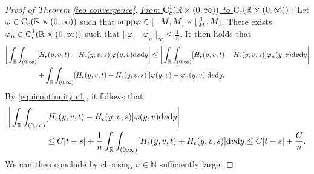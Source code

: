 \documentclass[11pt]{article}
\numberwithin{equation}{section}
\newcommand{\supp}{\textup{supp}}
\newcommand{\der}{\textup{d}}
\begin{document}
\begin{proof}[Proof of Theorem \ref{teo convergence}]
\textit{\underline{From $\textup{C}^{1}_{c}(\mathbb{R}\times(0,\infty))$ to  $\textup{C}_{c}(\mathbb{R}\times(0,\infty)):$}}  Let $\varphi\in\textup{C}_{c}(\mathbb{R}\times(0,\infty))$ such that $\supp\varphi\in[-M,M]\times [\frac{1}{M},M]$. There exists $\varphi_{n}\in\textup{C}^{1}_{c}(\mathbb{R}\times(0,\infty))$ such that $||\varphi-\varphi_{n}||_{\infty}\leq \frac{1}{n}$. It then holds that
\begin{align*}
    \bigg|\int_{\mathbb{R}}\int_{(0,\infty)} & [H_{\epsilon}(y,v,t)-H_{\epsilon}(y,v,s)]\varphi(y,v)\der v \der y\bigg|\leq \bigg|\int_{\mathbb{R}}\int_{(0,\infty)} [H_{\epsilon}(y,v,t)-H_{\epsilon}(y,v,s)]\varphi_{n}(y,v)\der v \der y\bigg|\\
    &+\int_{\mathbb{R}}\int_{(0,\infty)} [H_{\epsilon}(y,v,t)+H_{\epsilon}(y,v,s)]|\varphi(y,v)-\varphi_{n}(y,v)|\der v \der y.
\end{align*}
By \eqref{equicontinuity c1}, it follows that 
\begin{align}\label{equi compact supp}
    \bigg|\int_{\mathbb{R}}\int_{(0,\infty)} & [H_{\epsilon}(y,v,t)-H_{\epsilon}(y,v,s)]\varphi(y,v)\der v \der y\bigg|\nonumber\\
    &\leq C|t-s|+\frac{1}{n}\int_{\mathbb{R}}\int_{(0,\infty)} [H_{\epsilon}(y,v,t)+H_{\epsilon}(y,v,s)]\der v \der y\leq C|t-s|+\frac{C}{n}.
\end{align}
We can then conclude by choosing $n\in\mathbb{N}$ sufficiently large.


\end{proof}
\end{document}
